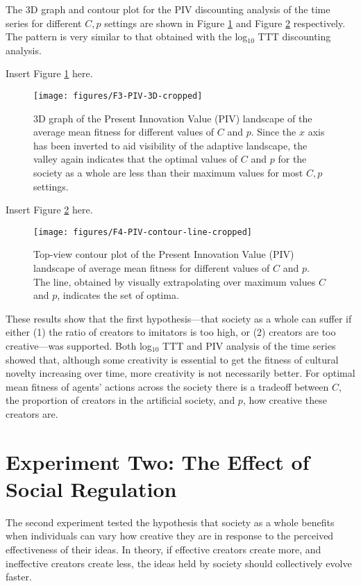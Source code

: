 \documentclass[a4paper,12pt,man,british]{apa6}
\begin{document}
The 3D graph and contour plot for the PIV discounting analysis of the time series for different ${C,p}$ settings are shown in Figure \ref{fig:PIV-cropped} and Figure \ref{fig:PIV-contour-line-cropped} respectively. The pattern is very  similar to that obtained with the  log$_{10}$ TTT discounting analysis. 

\begin{center}
Insert Figure \ref{fig:PIV-cropped} here.
\end{center}

\begin{figure}
\centering
\texttt{[image: figures/F3-PIV-3D-cropped]}
\caption{3D graph of the Present Innovation Value (PIV) landscape of the average mean fitness for different values of $C$ and $p$. Since the $x$ axis has been inverted to aid visibility of the adaptive landscape, the valley again indicates that the optimal values of $C$ and $p$ for the society as a whole are less than their maximum values for most ${C,p}$ settings.}%
\label{fig:PIV-cropped}
\end{figure}

\begin{center} %
Insert Figure \ref{fig:PIV-contour-line-cropped} here.
\end{center}

\begin{figure}
\centering
\texttt{[image: figures/F4-PIV-contour-line-cropped]}
\caption{Top-view contour plot of the Present Innovation Value (PIV) landscape of average mean fitness for different values of $C$ and $p$. The line, obtained by visually extrapolating over maximum values $C$ and $p$, indicates the set of optima.}
\label{fig:PIV-contour-line-cropped}
\end{figure}

These results show that the first hypothesis---that society as a whole can suffer if either (1) the ratio of creators to imitators is too high, or (2) creators are too creative---was supported. Both log$_{10}$ TTT  and PIV analysis of the time series showed that, although some creativity is essential to get the fitness of cultural novelty increasing over time, more creativity is not necessarily better. For optimal mean fitness of agents' actions across the society there is a tradeoff between $C$, the proportion of creators in the artificial society, and $p$, how creative these creators are. 

\section{Experiment Two: The Effect of Social Regulation}
 The second experiment tested the hypothesis that society as a whole benefits when individuals can vary how creative they are in response to the perceived effectiveness of their ideas. In theory, if effective creators create more, and ineffective creators create less, the ideas held by society should collectively evolve faster. 
\end{document}
